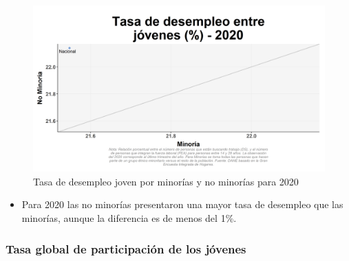     \begin{figure}[H]
        \caption{Tasa de desempleo joven por minorías y no minorías para 2020 \label{map_result_2} }
        \begin{center}
        \includegraphics[width=\textwidth,keepaspectratio]{img/var_54_scatter.png}
        \end{center}
    \end{figure}
            \begin{itemize}
                \item Para 2020 las no minorías presentaron una mayor tasa de desempleo que las minorías, aunque la diferencia es de menos del 1\%.
                \end{itemize}

        \subsubsection{Tasa global de participación de los jóvenes}

